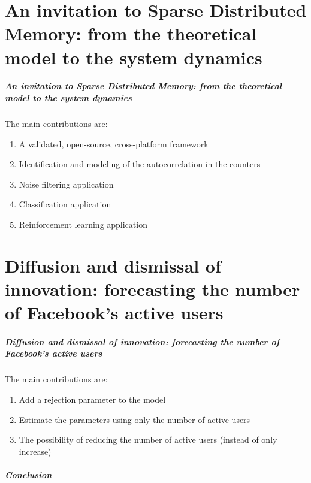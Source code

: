 \documentclass{beamer}
\begin{document}
\part{An invitation to Sparse Distributed Memory: from the theoretical model to the system dynamics}
\begin{frame}
\frametitle{An invitation to Sparse Distributed Memory: from the theoretical model to the system dynamics}

The main contributions are:
\begin{enumerate}[i]
\item A validated, open-source, cross-platform framework
\item Identification and modeling of the autocorrelation in the counters
\item Noise filtering application
\item Classification application
\item Reinforcement learning application
\end{enumerate}
\end{frame}


\part{Diffusion and dismissal of innovation: forecasting the number of Facebook’s active users}
\begin{frame}
\frametitle{Diffusion and dismissal of innovation: forecasting the number of Facebook’s active users}

The main contributions are:
\begin{enumerate}[i]
\item Add a rejection parameter to the model
\item Estimate the parameters using only the number of active users
\item The possibility of reducing the number of active users (instead of only increase)
\end{enumerate}
\end{frame}

\begin{frame}
\frametitle{Conclusion}
\end{frame}
\end{document}
